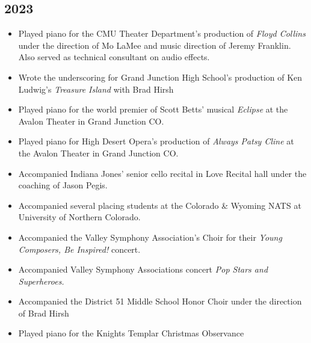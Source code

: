\documentclass{article}
\newcommand{\cvItem}[1]{
        \item {
            {#1}
        }
    }
\newcommand{\cvItemListStart}{\begin{itemize}[leftmargin=10pt]}
\newcommand{\cvItemListEnd}{\end{itemize}}
\begin{document}
        \subsection{2023}
            \cvItemListStart
                \cvItem{Played piano for the CMU Theater Department's production of {\em Floyd
                Collins} under the direction of Mo LaMee and music direction of Jeremy Franklin.
                Also served as technical consultant on audio effects.}
                \cvItem{Wrote the underscoring for Grand Junction High School's production of Ken
                Ludwig's {\em Treasure Island} with Brad Hirsh}
                \cvItem{Played piano for the world premier of Scott Betts' musical {\em Eclipse} at
                the Avalon Theater in Grand Junction CO.}
                \cvItem{Played piano for High Desert Opera's production of {\em Always Patsy Cline}
                at the Avalon Theater in Grand Junction CO.}
                \cvItem{Accompanied Indiana Jones' senior cello recital in Love Recital hall under
                the coaching of Jason Pegis.}
                \cvItem{Accompanied several placing students at the Colorado \& Wyoming NATS at
                University of Northern Colorado.}
                \cvItem{Accompanied the Valley Symphony Association's Choir for their {\em Young
                Composers, Be Inspired!} concert.}
                \cvItem{Accompanied Valley Symphony Associations concert {\em Pop Stars and
                Superheroes.}}
                \cvItem{Accompanied the District 51 Middle School Honor Choir under the direction of
                Brad Hirsh}
                \cvItem{Played piano for the Knights Templar Christmas Observance}
            \cvItemListEnd
\end{document}
